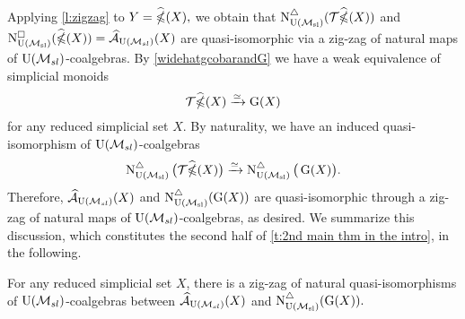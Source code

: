 	Applying \cref{l:zigzag} to $Y= \widehat{\ccobar}(X),$ we obtain that $\schainsUSL (\mathcal{T} \widehat{\ccobar}(X))$ and $\cchainsUSL(\widehat{\ccobar}(X)) = \Ahat_{\USL}(X)$ are quasi-isomorphic via a zig-zag of natural maps of $\USL$-coalgebras.
	By \cref{widehatgcobarandG} we have a weak equivalence of simplicial monoids
	\begin{equation*}
	\mathcal{T}\widehat{\ccobar}(X) \xrightarrow{\simeq} \kan(X)
	\end{equation*}
	for any reduced simplicial set $X$.
	By naturality, we have an induced quasi-isomorphism of $\USL$-coalgebras
	\begin{equation*}
	\schainsUSL \big( \mathcal{T}\widehat{\ccobar}(X) \big) \xra{\simeq}
	\schainsUSL \big( \kan(X) \big).
	\end{equation*}
	Therefore, $\Ahat_{\USL}(X)$ and $\schainsUSL(\kan(X))$ are quasi-isomorphic through a zig-zag of natural maps of $\USL$-coalgebras, as desired.
We summarize this discussion, which constitutes the second half of \cref{t:2nd main thm in the intro}, in the following.
\begin{lemma}
For any reduced simplicial set $X$, there is a zig-zag of natural quasi-isomorphisms of $\USL$-coalgebras between $\Ahat_\USL(X)$ and $\schainsUSL(\kan(X)).$
\end{lemma}